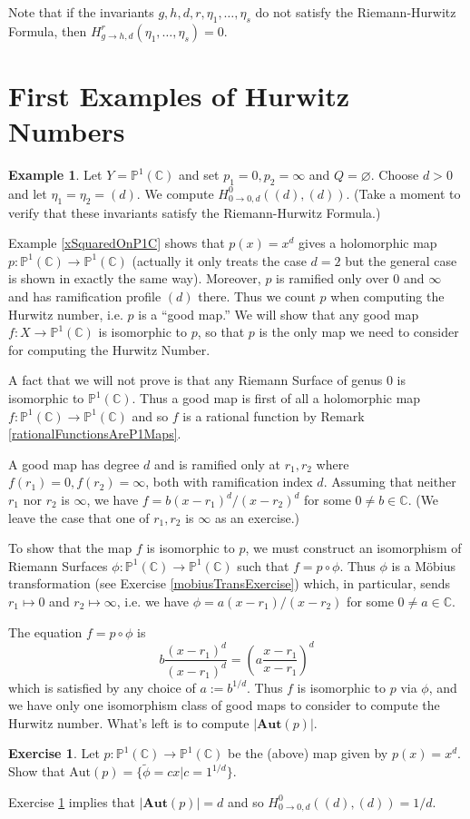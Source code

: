 \documentclass[12pt]{book}%
\theoremstyle{plain}
\theoremstyle{definition}
\newtheorem{example}[theorem]{Example}
\newtheorem{exercise}{Exercise}
\theoremstyle{remark}
\def\to{\rightarrow}
\def\bC{{\mathbb{C}}}
\newcommand{\PoneC}{{\mathbb P}^1({\mathbb C})}
\begin{document}
Note that if the invariants $g, h, d, r, \eta_1, \ldots, \eta_s$ do not satisfy the Riemann-Hurwitz Formula, then $H^r_{g\to h, d}(\eta_1,\ldots,\eta_s) = 0$.

\section{First Examples of Hurwitz Numbers}
\begin{example}
Let $Y=\PoneC$ and set $p_1 = 0, p_2 = \infty$ and $Q = \varnothing$. Choose $d>0$ and let $\eta_1 = \eta_2 = (d)$. We compute $H^0_{0\to 0, d}((d),(d))$. (Take a moment to verify that these invariants satisfy the Riemann-Hurwitz Formula.)

Example \ref{xSquaredOnP1C} shows that $p(x) = x^d$ gives a holomorphic map $p:\PoneC \to \PoneC$ (actually it only treats the case $d=2$ but the general case is shown in exactly the same way). Moreover, $p$ is ramified only over $0$ and $\infty$ and has ramification profile $(d)$ there. Thus we count $p$ when computing the Hurwitz number, i.e. $p$ is a ``good map.'' We will show that any good map $f:X \to \PoneC$ is isomorphic to $p$, so that $p$ is the only map we need to consider for computing the Hurwitz Number.

A fact that we will not prove is that any Riemann Surface of genus 0 is isomorphic to $\PoneC$. Thus a good map is first of all a holomorphic map $f:\PoneC \to \PoneC$ and so $f$ is a rational function by Remark \ref{rationalFunctionsAreP1Maps}.

A good map has degree $d$ and is ramified only at $r_1,r_2$ where $f(r_1) = 0, f(r_2) = \infty$, both with ramification index $d$. Assuming that neither $r_1$ nor $r_2$ is $\infty$, we have $f = b(x-r_1)^d/(x-r_2)^d$ for some $0\neq b \in \bC$. (We leave the case that one of $r_1,r_2$ is $\infty$ as an exercise.)

To show that the map $f$ is isomorphic to $p$, we must construct an isomorphism of Riemann Surfaces $\phi:\PoneC \to \PoneC$ such that $f = p \circ \phi$. Thus $\phi$ is a M\"{o}bius transformation (see Exercise \ref{mobiusTransExercise}) which, in particular, sends $r_1 \mapsto 0$ and $r_2 \mapsto \infty$, i.e. we have $\phi = a(x-r_1)/(x-r_2)$ for some $0\neq a \in \bC$.

The equation $f = p \circ \phi$ is
\[
b\frac{(x-r_1)^d}{(x-r_1)^d} = \left(a\frac{x-r_1}{x-r_1}\right)^d
\]
which is satisfied by any choice of $a:=b^{1/d}$. Thus $f$ is isomorphic to $p$ via $\phi$, and we have only one isomorphism class of good maps to consider to compute the Hurwitz number. What's left is to compute $|\textbf{Aut}(p)|$.

\begin{exercise}
\label{autOfP}
Let $p:\PoneC \to \PoneC$ be the (above) map given by $p(x) = x^d$. Show that $\text{Aut}(p) = \{ \tilde{\phi}= cx | c = 1^{1/d}\}$. 
\end{exercise}
Exercise \ref{autOfP} implies that $|\textbf{Aut}(p)| = d$ and so $H^0_{0\to 0, d}((d),(d)) = 1/d$.
\end{example}
\end{document}

